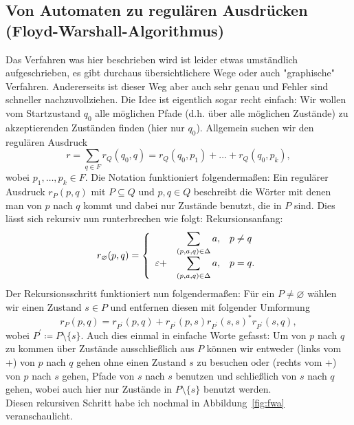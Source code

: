 \documentclass[11pt, a4paper]{article}
\let\emptyset\varnothing
\begin{document}
\subsection*{Von Automaten zu regulären Ausdrücken (Floyd-Warshall-Algorithmus)}
Das Verfahren was hier beschrieben wird ist leider etwas umständlich aufgeschrieben, es gibt durchaus übersichtlichere Wege oder auch "graphische" Verfahren. Andererseits ist dieser Weg aber auch sehr genau und Fehler sind schneller nachzuvollziehen. Die Idee ist eigentlich sogar recht einfach: Wir wollen vom Startzustand $q_0$ alle möglichen Pfade (d.h. über alle möglichen Zustände) zu akzeptierenden Zuständen finden (hier nur $q_0$). Allgemein suchen wir den regulären Ausdruck
$$
	r = \sum_{q \in F} r_Q(q_0, q) = r_Q(q_0, p_1) + \ldots + r_Q(q_0, p_k),
$$
wobei $p_1, \ldots, p_k \in F$. Die Notation funktioniert folgendermaßen: Ein regulärer Ausdruck $r_P(p, q)$ mit $P \subseteq Q$ und $p, q \in Q$ beschreibt die Wörter mit denen man von $p$ nach $q$ kommt und dabei nur Zustände benutzt, die in $P$ sind. Dies lässt sich rekursiv nun runterbrechen wie folgt: 
Rekursionsanfang:
$$
	r_\emptyset(p, q) = \left\lbrace
		\begin{array}{*3{>{\displaystyle}l}p{5cm}}
			\ &\sum_{(p, a, q) \in \Delta} a, & p \neq q\\
			\varepsilon + &\sum_{(p, a, q) \in \Delta} a, & p = q.
		\end{array}
	\right.
$$
Der Rekursionsschritt funktioniert nun folgendermaßen: Für ein \( P \neq \emptyset \) wählen wir einen Zustand  \( s \in P \) und entfernen diesen mit folgender Umformung
$$
	r_P(p, q) = r_{P^\prime}(p, q) + r_{P^\prime}(p, s) r_{P^\prime}(s, s)^\ast r_{P^\prime}(s, q),
$$
wobei $P^\prime \coloneqq P \setminus \{ s \}$. Auch dies einmal in einfache Worte gefasst: Um von $p$ nach $q$ zu kommen über Zustände ausschließlich aus $P$ können wir entweder (links vom +) von $p$ nach $q$ gehen ohne einen Zustand $s$ zu besuchen oder (rechts vom +) von $p$ nach $s$ gehen, Pfade von $s$ nach $s$ benutzen und schließlich von $s$ nach $q$ gehen, wobei auch hier nur Zustände in $P \setminus \{ s \}$ benutzt werden.\\
Diesen rekursiven Schritt habe ich nochmal in Abbildung~\ref{fig:fwa} veranschaulicht.
\end{document}

